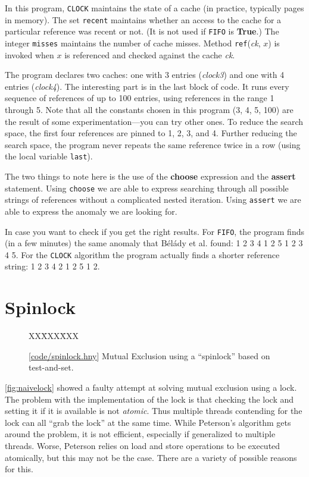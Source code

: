 \documentclass{report}
\newcommand{\harmonysource}[1]{
\begin{tabbing}
XX\=XXX\=XXX\kill
    
\end{tabbing}
}
\newcommand{\harmonylink}[1]{%
[\href{https://harmony.cs.cornell.edu/#1}{\underline{#1}}]%
}
\newenvironment{code}{
\tcolorbox
}{
\endtcolorbox
}
\begin{document}
In this program, \texttt{CLOCK} maintains the state of a cache
(in practice, typically pages in memory).
The set \texttt{recent} maintains whether an access to the cache
for a particular reference was recent or not.
(It is not used if \texttt{FIFO} is \textbf{True}.)
The integer \texttt{misses} maintains the number of cache misses.
Method \texttt{ref}(\textit{ck}, $x$) is invoked when $x$ is
referenced and checked against the cache \textit{ck}.

The program declares two caches: one with 3 entries (\textit{clock3})
and one with 4 entries (\textit{clock4}).
The interesting part is in the last block of code.
It runs every sequence of references of up to 100 entries, using
references in the range 1 through 5.
Note that all the constants chosen in this program (3, 4, 5, 100)
are the result of some experimentation---you can try other ones.
To reduce the search space, the first four references are pinned
to 1, 2, 3, and 4.
Further reducing the search space, the program never repeats the
same reference twice in a row (using the local variable \texttt{last}).

The two things to note here is the use of the \textbf{choose}
expression and the \textbf{assert} statement.  Using \texttt{choose}
we are able to express searching through all possible strings of
references without a complicated nested iteration.
Using \texttt{assert} we are able to express the anomaly we are
looking for.

In case you want to check if you get the right results.  For \texttt{FIFO},
the program finds (in a few minutes) the same anomaly that
B\'{e}l\'{a}dy et al. found: 1 2 3 4 1 2 5 1 2 3 4 5.
For the \texttt{CLOCK} algorithm the program actually finds a shorter
reference string: 1 2 3 4 2 1 2 5 1 2.

\chapter{Spinlock}
\label{ch:spinlock}
%

%

\begin{figure}
\begin{code}
\harmonysource{spinlock}
\end{code}
\caption{\harmonylink{code/spinlock.hny} Mutual Exclusion using a ``spinlock'' based on test-and-set.}
\label{fig:tas}
\end{figure}

\autoref{fig:naivelock} showed a faulty attempt at solving mutual
exclusion using a lock.  The problem with the implementation of the
lock is that checking the lock and setting it if it is available is
not \emph{atomic}.  Thus multiple threads contending for the lock
can all ``grab the lock'' at the same time.  While Peterson's
algorithm gets around the problem, it is not efficient, especially
if generalized to multiple threads.
Worse, Peterson relies on load and store operations to be executed
atomically, but this may not be the case.
There are a variety of possible reasons for this.
\end{document}
